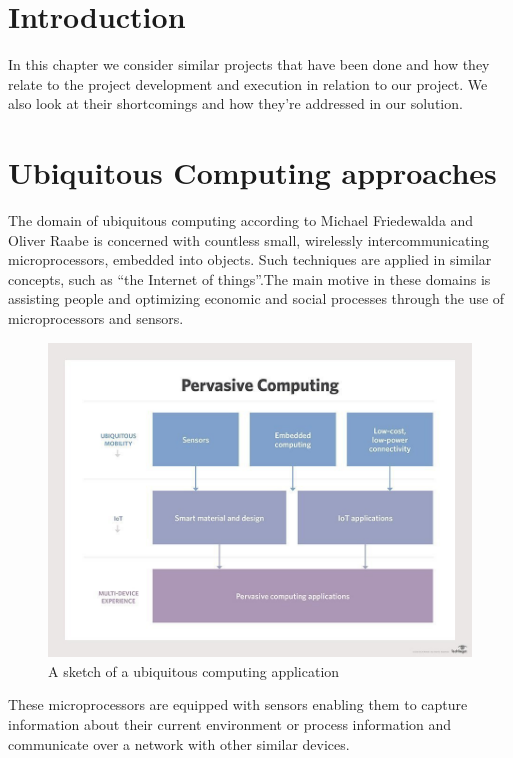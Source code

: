 \section{Introduction}
In this chapter we consider similar projects that have been done and how they relate to the project development and execution in relation to our project. We also look at their shortcomings and how they're addressed in our solution.


\section{Ubiquitous Computing approaches}
The domain of ubiquitous computing according to Michael Friedewalda and Oliver Raabe is concerned with countless small, wirelessly intercommunicating microprocessors, embedded into objects. Such techniques are applied in similar concepts, such as ``the Internet of things''.The main motive in these domains is assisting people and optimizing economic and social processes through the use of microprocessors and sensors.

\begin{figure}[h]
    \begin{center}
        \includegraphics[scale = 0.34]{images/ubq}
        \caption{A sketch of a ubiquitous computing application}
    \end{center}
\end{figure}
These microprocessors are equipped with sensors enabling them to capture information about their current environment or process information and communicate over a network with other similar devices\cite{friedewald_ubiquitous_2011}.


